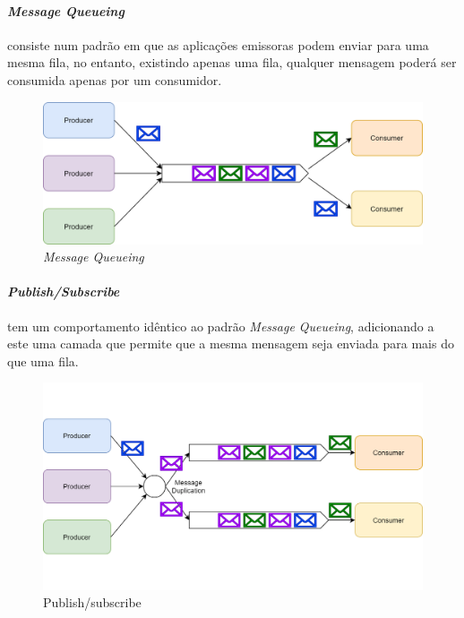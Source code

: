 \paragraph{\emph{Message Queueing}} \label{message_queueing} consiste num padrão em que as aplicações emissoras podem enviar para uma mesma fila, no entanto, existindo  apenas uma fila, qualquer mensagem poderá ser consumida apenas por um consumidor.

\begin{figure}[h]
    \begin{center}
    \includegraphics[width=1\textwidth]{figures/message_queueing.png}
    \caption{\emph{Message Queueing}}
    \end{center}
\end{figure}

\paragraph{\emph{Publish/Subscribe}} \label{publish_subscribe} tem um comportamento idêntico ao padrão \emph{Message Queueing}, adicionando a este uma camada que permite que a mesma mensagem seja enviada para mais do que uma fila.

\begin{figure}[h]
    \begin{center}
    \includegraphics[width=1\textwidth]{figures/pub_sub.png}
    \caption{Publish/subscribe}
    \end{center}
\end{figure}

